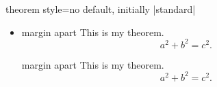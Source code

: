 \begin{docTcbKey}{theorem style}{=}{no default, initially |standard|}
\begin{itemize}
\begin{dispExample}
\begin{theorem}[theorem style=margin break,left=10mm]{margin break}{}
\end{theorem}
\begin{theorem}[theorem style=margin break,left=10mm,oversize]{margin break}{}
This is my theorem. \begin{equation*} a^2 + b^2 = c^2. \end{equation*}
\end{theorem}
\end{dispExample}
%
\item{}
\begin{dispExample}
\begin{theorem}[theorem style=margin apart,left=10mm]{margin apart}{}
This is my theorem. \begin{equation*} a^2 + b^2 = c^2. \end{equation*}
\end{theorem}
\begin{theorem}[theorem style=margin apart,left=10mm,oversize]{margin apart}{}
This is my theorem. \begin{equation*} a^2 + b^2 = c^2. \end{equation*}
\end{theorem}
\end{dispExample}
%
\end{itemize}
\end{docTcbKey}

